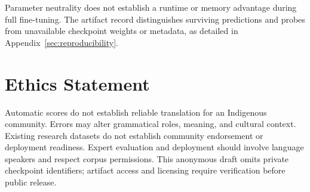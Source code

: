 \documentclass[11pt]{article}
\begin{document}
Parameter neutrality does not establish a runtime or memory advantage during full fine-tuning. The artifact record distinguishes surviving predictions and probes from unavailable checkpoint weights or metadata, as detailed in Appendix~\ref{sec:reproducibility}.

\section*{Ethics Statement}
Automatic scores do not establish reliable translation for an Indigenous community. Errors may alter grammatical roles, meaning, and cultural context. Existing research datasets do not establish community endorsement or deployment readiness. Expert evaluation and deployment should involve language speakers and respect corpus permissions. This anonymous draft omits private checkpoint identifiers; artifact access and licensing require verification before public release.



\newpage
\appendix
\end{document}

